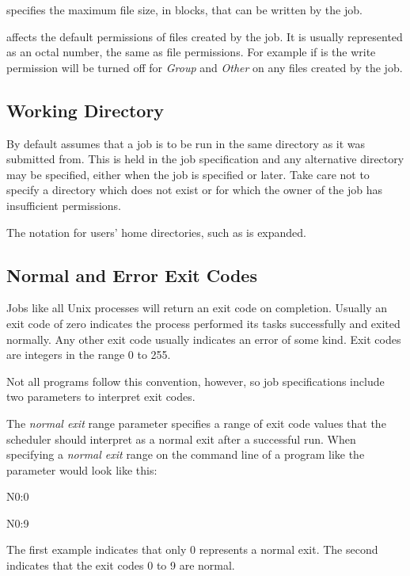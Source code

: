  specifies the maximum file size, in blocks, that can be written by the job.

 affects the default permissions of files created by the job. It is usually represented as an octal number, the
same as file permissions. For example if  is  the write permission will be turned off
for \textit{Group} and \textit{Other} on any files created by the job.

\subsection[Working Directory]{Working Directory}
By default \ProductName{} assumes that a job is to be run in the same directory as it was submitted from. This is held in the job
specification and any alternative directory may be specified, either when the job is specified or later. Take care not to specify a
directory which does not exist or for which the owner of the job has insufficient permissions.

The \exampletext{\~{}} notation for users' home directories, such as  is expanded.

\subsection{Normal and Error Exit Codes}
Jobs like all Unix processes will return an exit code on completion. Usually an exit code of zero indicates the process performed its tasks
successfully and exited normally. Any other exit code usually indicates an error of some kind. Exit codes are integers in the range 0 to 255.

Not all programs follow this convention, however, so job specifications include two parameters to interpret exit codes.

The \textit{normal exit} range parameter specifies a range of exit code values that the scheduler should interpret as a normal exit after a
successful run. When specifying a \textit{normal exit} range on the command line of a program like \BtrName{} the parameter would look like this:

\begin{expara}

N0:0

N0:9

\end{expara}

The first example indicates that only 0 represents a normal exit. The second indicates that the exit codes 0 to 9 are normal.

